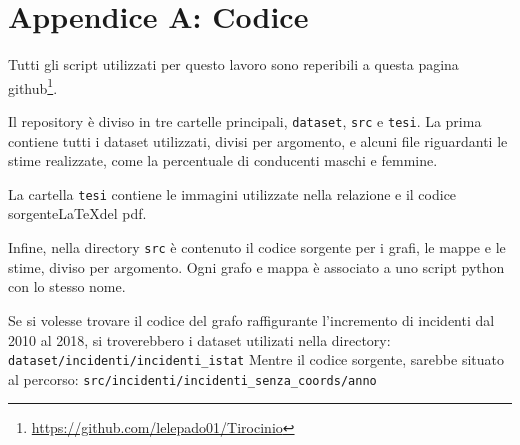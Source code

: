 \documentclass[a4paper,12pt]{report}
\newcommand{\columnstyle}[1]{\texttt{#1}}
\newcommand{\skipline}{\vspace{0.2in}}
\begin{document}


\appendix
\chapter{Appendice A: Codice}

Tutti gli script utilizzati per questo lavoro sono reperibili a questa pagina 
github\footnote{\url{https://github.com/lelepado01/Tirocinio}}.

Il repository è diviso in tre cartelle principali, \columnstyle{dataset}, \columnstyle{src} 
e \columnstyle{tesi}. La prima contiene tutti i dataset utilizzati, divisi per 
argomento, e alcuni file riguardanti le stime realizzate, come la percentuale di 
conducenti maschi e femmine.

La cartella \columnstyle{tesi} contiene le immagini utilizzate nella relazione e il codice 
sorgente\LaTeX del pdf.

Infine, nella directory \columnstyle{src} è contenuto il codice sorgente per i grafi, 
le mappe e le stime, diviso per argomento. Ogni grafo e mappa è associato a uno script python 
con lo stesso nome.

Se si volesse trovare il codice del grafo raffigurante l'incremento di incidenti 
dal 2010 al 2018, si troverebbero i dataset utilizati nella directory:
\skipline
\indent\columnstyle{dataset/incidenti/incidenti\_istat}
\skipline
Mentre il codice sorgente, sarebbe situato al percorso:
\skipline
\indent\columnstyle{src/incidenti/incidenti\_senza\_coords/anno}

\printbibliography
\end{document}
